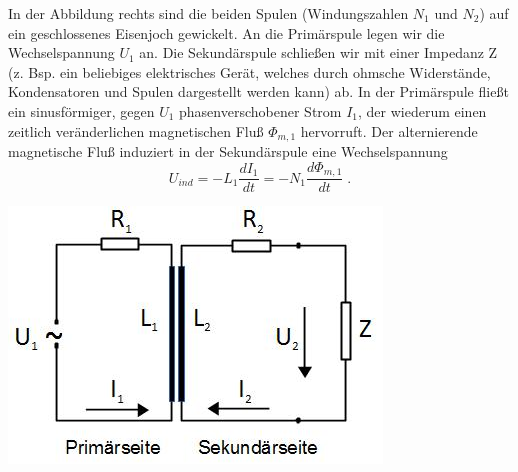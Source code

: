 \noindent
\begin{minipage}{0.6\textwidth}
In der Abbildung rechts sind die beiden Spulen (Windungszahlen $N_1$ und $N_2$) auf ein geschlossenes Eisenjoch gewickelt. An die Primärspule legen wir die Wechselspannung $U_1$ an. Die Sekundärspule schließen wir mit einer Impedanz Z (z. Bsp. ein beliebiges elektrisches Gerät, welches durch ohmsche Widerstände, Kondensatoren und Spulen dargestellt werden kann) ab. In der Primärspule fließt ein sinusförmiger, gegen $U_1$ phasenverschobener Strom $I_1$, der wiederum einen zeitlich veränderlichen magnetischen Fluß $\Phi_{m,1}$ hervorruft. Der alternierende magnetische Fluß induziert in der Sekundärspule eine Wechselspannung
\begin{equation}
U_{ind} = -L_1\frac{dI_1}{dt} = -N_1\frac{d\Phi_{m,1}}{dt}\; .
\end{equation}
\end{minipage}
%
\begin{minipage}{0.4\textwidth}
	\includegraphics[width=\textwidth]{Abbildungen/Trafo1.jpg}
	\label{fig:Trafo1}
\end{minipage}
%

